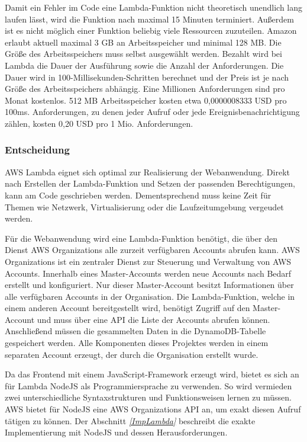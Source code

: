 {Damit ein Fehler im Code eine Lambda-Funktion nicht theoretisch unendlich lang laufen lässt, wird die Funktion nach maximal 15 Minuten terminiert.
Außerdem ist es nicht möglich einer Funktion beliebig viele Ressourcen zuzuteilen.
Amazon erlaubt aktuell maximal 3 GB an Arbeitsspeicher und minimal 128 MB.
Die Größe des Arbeitsspeichers muss selbst ausgewählt werden.
\clearpage
Bezahlt wird bei Lambda die Dauer der Ausführung sowie die Anzahl der Anforderungen.
Die Dauer wird in 100-Millisekunden-Schritten berechnet und der Preis ist je nach Größe des Arbeitsspeichers abhängig.
Eine Millionen Anforderungen sind pro Monat kostenlos.
512 MB Arbeitsspeicher kosten etwa 0,0000008333 USD pro 100ms.
Anforderungen, zu denen jeder Aufruf oder jede Ereignisbenachrichtigung zählen, kosten 0,20 USD pro 1 Mio. Anforderungen.\cite{LambdaPreise}

\subsubsection{Entscheidung}
\label{LambdaEntscheidung}
AWS Lambda eignet sich optimal zur Realisierung der Webanwendung.
Direkt nach Erstellen der Lambda-Funktion und Setzen der passenden Berechtigungen, kann am Code geschrieben werden.
Dementsprechend muss keine Zeit für Themen wie Netzwerk, Virtualisierung oder die Laufzeitumgebung vergeudet werden.

Für die Webanwendung wird eine Lambda-Funktion benötigt, die über den Dienst AWS Organizations alle zurzeit verfügbaren Accounts abrufen kann.
AWS Organizations ist ein zentraler Dienst zur Steuerung und Verwaltung von AWS Accounts.
Innerhalb eines Master-Accounts werden neue Accounts nach Bedarf erstellt und konfiguriert.
Nur dieser Master-Account besitzt Informationen über alle verfügbaren Accounts in der Organisation.
Die Lambda-Funktion, welche in einem anderen Account bereitgestellt wird, benötigt Zugriff auf den Master-Account und muss über eine API die Liste der Accounts abrufen können.
Anschließend müssen die gesammelten Daten in die DynamoDB-Tabelle gespeichert werden.
Alle Komponenten dieses Projektes werden in einem separaten Account erzeugt, der durch die Organisation erstellt wurde.

Da das Frontend mit einem JavaScript-Framework erzeugt wird, bietet es sich an für Lambda NodeJS als Programmiersprache zu verwenden.
So wird vermieden zwei unterschiedliche Syntaxstrukturen und Funktionsweisen lernen zu müssen.
AWS bietet für NodeJS eine AWS Organizations API an, um exakt diesen Aufruf tätigen zu können.
Der Abschnitt \textit{\ref{ImpLambda} } beschreibt die exakte Implementierung mit NodeJS und dessen Herausforderungen.

}

